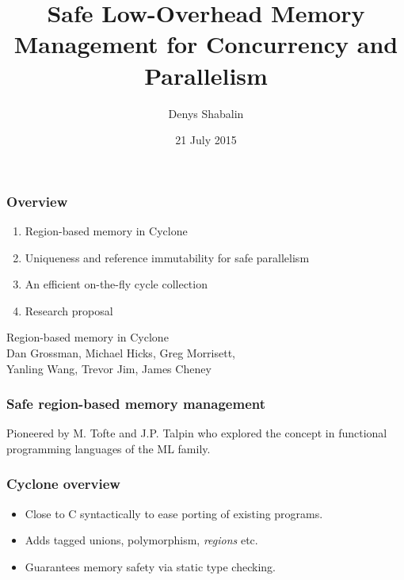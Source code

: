 \newcommand{\rts}{\ \dashv\ }

\title{Safe Low-Overhead Memory Management for Concurrency and Parallelism}
\author{Denys Shabalin}
\date{21 July 2015}
{
\begin{frame}
    \titlepage
\end{frame}
}


\begin{frame}
    \frametitle{Overview}
    \begin{enumerate}
        \item Region-based memory in Cyclone
        \item Uniqueness and reference immutability for safe parallelism
        \item An efficient on-the-fly cycle collection
        \item Research proposal
    \end{enumerate}
\end{frame}

\begin{frame}
    \begin{center}
        {\LARGE Region-based memory in Cyclone} \\
        \vspace{20pt}
        Dan Grossman, Michael Hicks, Greg Morrisett,\\
        Yanling Wang, Trevor Jim, James Cheney
    \end{center}
\end{frame}

\begin{frame}
    \frametitle{Safe region-based memory management}

    Pioneered by M. Tofte and J.P. Talpin who explored the concept in functional
    programming languages of the ML family.
\end{frame}

\begin{frame}
    \frametitle{Cyclone overview}
    \begin{itemize}
        \item Close to C syntactically to ease porting of existing programs.
        \item Adds tagged unions, polymorphism, \textit{regions} etc.
        \item Guarantees memory safety via static type checking.
    \end{itemize}
\end{frame}

